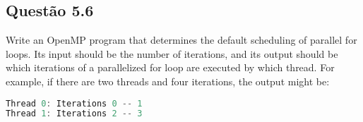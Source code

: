 
\subsection{Questão 5.6}

Write an OpenMP program that determines the default scheduling of parallel for loops. Its input should be the number of iterations, and its output should be which iterations of a parallelized for loop are executed by which thread. For example, if there are two threads and four iterations, the output might be:

\begin{lstlisting}[language=C]
Thread 0: Iterations 0 -- 1
Thread 1: Iterations 2 -- 3
\end{lstlisting}





